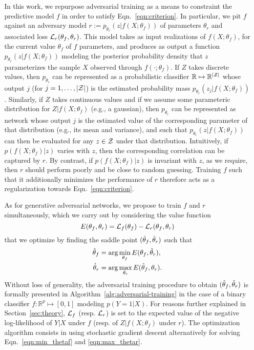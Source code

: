 \documentclass[twocolumn,superscriptaddress,aps]{revtex4-1}
\theoremstyle{plain}
\begin{document}
In this work, we repurpose adversarial training as a means to constraint the
predictive model $f$ in order to satisfy Eqn.~\ref{eqn:criterion}. In
particular, we pit $f$ against an adversary model $r := p_{\theta_r}(z |
f(X;\theta_f))$ of parameters $\theta_r$ and associated loss ${\cal
L}_r(\theta_f, \theta_r)$. This model takes  as input realizations of $f(X;
\theta_f)$, for the current value $\theta_f$ of $f$ parameters, and produces as
output a function $p_{\theta_r}(z | f(X;\theta_f))$ modeling the posterior
probability density that $z$ parameterizes the sample $X$ observed through
$f(\cdot;\theta_f)$. If $Z$ takes discrete values, then $p_{\theta_r}$ can be
represented as a probabilistic classifier $\mathbb{R} \mapsto \mathbb{R}^{|{\cal
Z|}}$ whose output $j$ (for $j=1, \dots, |{\cal Z}|$) is the estimated
probability mass $p_{\theta_r}(z_j|f(X;\theta_f))$. Similarly, if $Z$ takes
continuous values and if we assume some parameteric distribution for
$Z|f(X;\theta_f)$ (e.g., a gaussian), then $p_{\theta_r}$ can be represented as
network whose output $j$ is the estimated value of the corresponding parameter
of that distribution (e.g., its mean and variance), and such that
$p_{\theta_r}(z|f(X;\theta_f))$ can then be evaluated for any $z \in {\cal Z}$
under that distribution.  Intuitively, if $p(f(X; \theta_f)|z)$ varies with $z$,
then the corresponding correlation can be captured by $r$. By contrast, if
$p(f(X; \theta_f)|z)$ is invariant with $z$, as we require, then $r$ should
perform poorly and be close to random guessing. Training $f$ such that it
additionally minimizes the performance of $r$ therefore acts as a regularization
towards Eqn.~\ref{eqn:criterion}.

As for generative adversarial networks, we propose to
train $f$ and $r$ simultaneously, which we carry out by considering
the value function
\begin{equation}
    E(\theta_f, \theta_r) = {\cal L}_f(\theta_f) - {\cal L}_r(\theta_f, \theta_r)
\end{equation}
that we optimize by finding the saddle point $(\smash{\hat\theta_f}, \smash{\hat\theta_r})$ such that
\begin{align}
    \smash{\hat\theta_f} &= \arg \min_{\theta_f} E(\theta_f, \smash{\hat\theta_r}), \label{eqn:min_thetaf} \\
    \smash{\hat\theta_r} &= \arg \max_{\theta_r} E(\smash{\hat\theta_f}, \theta_r) \label{eqn:max_thetar}.
\end{align}
Without loss of generality, the adversarial training procedure to obtain
$(\smash{\hat\theta_f}, \smash{\hat\theta_r})$ is formally presented in
Algorithm~\ref{alg:adversarial-training} in the case of a binary classifier $f :
\mathbb{R}^p \mapsto [0,1]$ modeling $p(Y=1|X)$. For reasons further explained
in Section~\ref{sec:theory}, ${\cal L}_f$ (resp. ${\cal L}_r$) is set to the
expected value of the
negative log-likelihood of $Y|X$ under $f$ (resp. of $Z|f(X;\theta_f)$ under
$r$). The optimization algorithm consists in using stochastic gradient descent
alternatively for solving Eqn.~\ref{eqn:min_thetaf} and \ref{eqn:max_thetar}.
\end{document}
